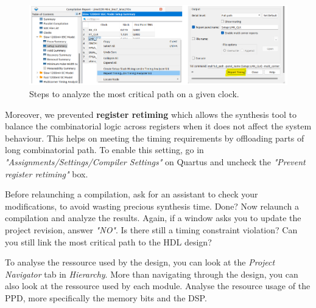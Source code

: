 \begin{enumerate}
\begin{figure}[h]
    \centering
    \includegraphics[width=\linewidth]{figures/Report_Timing_Analyzer.png}
    \caption{Steps to analyze the most critical path on a given clock.}
    \label{fig:report_timing_analyzer}
\end{figure}

Moreover, we prevented \textbf{register retiming} which allows the synthesis tool to balance the combinatorial logic across registers when it does not affect the system behaviour. This helps on meeting the timing requirements by offloading parts of long combinatorial path. To enable this setting, go in \textit{"Assignments/Settings/Compiler Settings"} on Quartus and uncheck the \textit{"Prevent register retiming"} box.

Before relaunching a compilation, ask for an assistant to check your modifications, to avoid wasting precious synthesis time. Done? Now relaunch a compilation and analyze the results. Again, if a window asks you to update the project revision, answer \textit{"NO"}. Is there still a timing constraint violation? Can you still link the most critical path to the HDL design?

To analyse the ressource used by the design, you can look at the \textit{Project Navigator} tab in \textit{Hierarchy}. More than navigating through the design, you can also look at the ressource used by each module. Analyse the resource usage of the PPD, more specifically the memory bits and the DSP.

\end{enumerate}
